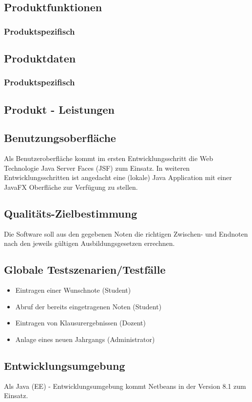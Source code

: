 \documentclass[12pt,a4paper,parskip]{scrreprt}
\begin{document}
\subsection{Produktfunktionen}
\subsubsection{Produktspezifisch}
\subsection{Produktdaten}
\subsubsection{Produktspezifisch}
\subsection{Produkt - Leistungen}
\subsection{Benutzungsoberfläche}
Als Benutzeroberfläche kommt im ersten Entwicklungsschritt die Web Technologie Java Server Faces (JSF) zum Einsatz. In weiteren Entwicklungsschritten ist angedacht eine (lokale) Java Application mit einer JavaFX Oberfläche zur Verfügung zu stellen.
\subsection{Qualitäts-Zielbestimmung}
Die Software soll aus den gegebenen Noten die richtigen Zwischen- und Endnoten nach den jeweils gültigen Ausbildungsgesetzen errechnen. 
\subsection{Globale Testszenarien/Testfälle}
\begin{itemize}
	\item Eintragen einer Wunschnote (Student)
	\item Abruf der bereits eingetragenen Noten (Student)
	\item Eintragen von Klausurergebnissen (Dozent)
	\item Anlage eines neuen Jahrgangs (Administrator)
\end{itemize}
\subsection{Entwicklungsumgebung}
Als Java (EE) - Entwicklungsumgebung kommt Netbeans in der Version 8.1 zum Einsatz.
\end{document}

